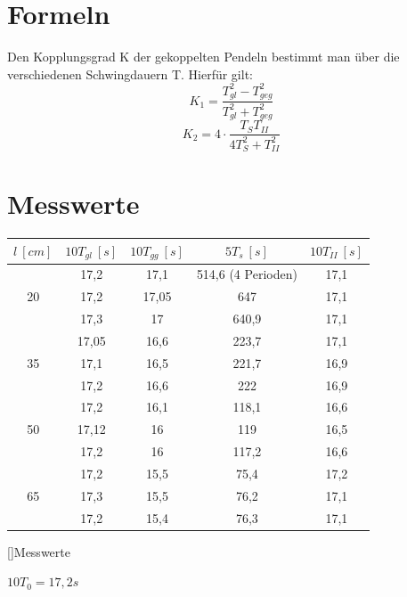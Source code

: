 \documentclass[12pt,a4paper,]{scrreprt}
\begin{document}
	\chapter{Formeln}
    Den Kopplungsgrad K der gekoppelten Pendeln bestimmt man über die verschiedenen Schwingdauern T. Hierfür gilt:
    \begin{equation}
    K_1=\frac{T^2_{gl}-T^2_{geg}}{T^2_{gl}+T^2_{geg}}
    \end{equation}
    \begin{equation}
    K_2=4 \cdot \frac{T_S T_{II}}{4T^2_{S}+T^2_{II}}
    \end{equation}
	\pagebreak



	\chapter{Messwerte}
  \begin{center}
  
    \begin{tabular}{c||c|c|c|c}
    $l~[cm] $& $10T_{gl}~[s]$ & $10T_{gg}~[s]$ &	$5T_{s}~[s]$ & $10T_{II}~[s]$ \\ \hline \hline
		&17,2	&17,1	&514,6 (4 Perioden)	&17,1\\
	20	&17,2	&17,05	&647	&17,1\\
		&17,3	&17		&640,9	&17,1\\ \hline
		&17,05	&16,6	&223,7	&17,1\\
	35	&17,1	&16,5	&221,7	&16,9\\
		&17,2	&16,6	&222	&16,9\\ \hline
		&17,2	&16,1	&118,1	&16,6\\
	50	&17,12	&16		&119	&16,5\\
		&17,2	&16		&117,2	&16,6\\ \hline
		&17,2	&15,5	&75,4	&17,2\\
	65	&17,3	&15,5	&76,2	&17,1\\
		&17,2	&15,4	&76,3	&17,1\\
    \end{tabular}
    []{Messwerte}
  \end{center}
     $10T_0=17,2s$
	\pagebreak

	

	
\end{document}
